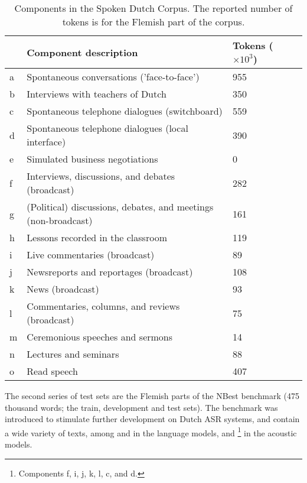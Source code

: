    \begin{table}
    	\begin{tabular}{llll}
              & Component description & \thead{Tokens \\ ($\times 10^3$)} \\ \hline
        	a & Spontaneous conversations ('face-to-face') & 955 & \\
            b & Interviews with teachers of Dutch & 350 & \\
            c & Spontaneous telephone dialogues (switchboard) & 559 & \\ %
            d & Spontaneous telephone dialogues (local interface) & 390 & \\ %
            e & Simulated business negotiations & 0 & \\
            f & Interviews, discussions, and debates (broadcast) & 282 & \\
            g & (Political) discussions, debates, and meetings (non-broadcast) & 161 & \\
            h & Lessons recorded in the classroom & 119 & \\
            i & Live commentaries (broadcast) & 89 & \\
            j & Newsreports and reportages (broadcast) & 108 & \\
            k & News (broadcast) & 93 & \\
            l & Commentaries, columns, and reviews (broadcast) & 75 & \\
            m & Ceremonious speeches and sermons & 14 & \\ 
            n & Lectures and seminars & 88 & \\
            o & Read speech & 407 & 
        \end{tabular}
        \caption{Components in the Spoken Dutch Corpus. The reported number of tokens is for the Flemish part of the corpus. }
        \label{tab:cgn}
    \end{table}
    
    The second series of test sets are the Flemish parts of the NBest benchmark\autocite{kessens2007n} (475 thousand words; the train, development and test sets). The benchmark was introduced to stimulate further development on Dutch ASR systems, and contain a wide variety of texts, among \mediargus and \cgn in the language models, and \cgn\footnote{Components f, i, j, k, l, c, and d.}  in the acoustic models.
 
    

